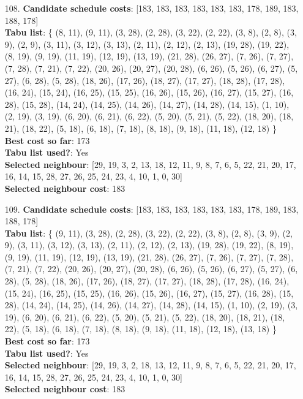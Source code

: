 \documentclass[fleqn]{article}
\begin{document}
\begin{itemize}
    \item[108.] \textbf{Candidate schedule costs}: [183, 183, 183, 183, 183, 183, 178, 189, 183, 188, 178] \\
    \textbf{Tabu list}: \{ (8, 11), (9, 11), (3, 28), (2, 28), (3, 22), (2, 22), (3, 8), (2, 8), (3, 9), (2, 9), (3, 11), (3, 12), (3, 13), (2, 11), (2, 12), (2, 13), (19, 28), (19, 22), (8, 19), (9, 19), (11, 19), (12, 19), (13, 19), (21, 28), (26, 27), (7, 26), (7, 27), (7, 28), (7, 21), (7, 22), (20, 26), (20, 27), (20, 28), (6, 26), (5, 26), (6, 27), (5, 27), (6, 28), (5, 28), (18, 26), (17, 26), (18, 27), (17, 27), (18, 28), (17, 28), (16, 24), (15, 24), (16, 25), (15, 25), (16, 26), (15, 26), (16, 27), (15, 27), (16, 28), (15, 28), (14, 24), (14, 25), (14, 26), (14, 27), (14, 28), (14, 15), (1, 10), (2, 19), (3, 19), (6, 20), (6, 21), (6, 22), (5, 20), (5, 21), (5, 22), (18, 20), (18, 21), (18, 22), (5, 18), (6, 18), (7, 18), (8, 18), (9, 18), (11, 18), (12, 18) \} \\
    \textbf{Best cost so far}: 173 \\
    \textbf{Tabu list used?}: Yes \\
    \textbf{Selected neighbour}: [29, 19, 3, 2, 13, 18, 12, 11, 9, 8, 7, 6, 5, 22, 21, 20, 17, 16, 14, 15, 28, 27, 26, 25, 24, 23, 4, 10, 1, 0, 30] \\
    \textbf{Selected neighbour cost}: 183
      

    \item[109.] \textbf{Candidate schedule costs}: [183, 183, 183, 183, 183, 183, 178, 189, 183, 188, 178] \\
    \textbf{Tabu list}: \{ (9, 11), (3, 28), (2, 28), (3, 22), (2, 22), (3, 8), (2, 8), (3, 9), (2, 9), (3, 11), (3, 12), (3, 13), (2, 11), (2, 12), (2, 13), (19, 28), (19, 22), (8, 19), (9, 19), (11, 19), (12, 19), (13, 19), (21, 28), (26, 27), (7, 26), (7, 27), (7, 28), (7, 21), (7, 22), (20, 26), (20, 27), (20, 28), (6, 26), (5, 26), (6, 27), (5, 27), (6, 28), (5, 28), (18, 26), (17, 26), (18, 27), (17, 27), (18, 28), (17, 28), (16, 24), (15, 24), (16, 25), (15, 25), (16, 26), (15, 26), (16, 27), (15, 27), (16, 28), (15, 28), (14, 24), (14, 25), (14, 26), (14, 27), (14, 28), (14, 15), (1, 10), (2, 19), (3, 19), (6, 20), (6, 21), (6, 22), (5, 20), (5, 21), (5, 22), (18, 20), (18, 21), (18, 22), (5, 18), (6, 18), (7, 18), (8, 18), (9, 18), (11, 18), (12, 18), (13, 18) \} \\
    \textbf{Best cost so far}: 173 \\
    \textbf{Tabu list used?}: Yes \\
    \textbf{Selected neighbour}: [29, 19, 3, 2, 18, 13, 12, 11, 9, 8, 7, 6, 5, 22, 21, 20, 17, 16, 14, 15, 28, 27, 26, 25, 24, 23, 4, 10, 1, 0, 30] \\
    \textbf{Selected neighbour cost}: 183
      


\end{itemize}
\end{document}
